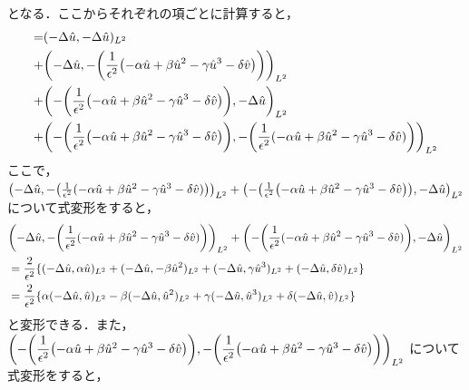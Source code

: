 となる．ここからそれぞれの項ごとに計算すると，
\begin{align}
   =&(-\Delta \hat{u},-\Delta \hat{u})_{L^2}\\
   +&\qty(-\Delta \hat{u},-\qty(\dfrac{1}{\epsilon^2}\qty(-\alpha \hat{u} + \beta \hat{u}^2 -\gamma \hat{u}^3-\delta \hat{v})))_{L^2}\\
   +&\qty(-\qty(\frac{1}{\epsilon^2}\qty(-\alpha \hat{u} + \beta \hat{u}^2 -\gamma \hat{u}^3-\delta \hat{v})),-\Delta \hat{u})_{L^2}\\
   +&\qty(-\qty(\frac{1}{\epsilon^2}\qty(-\alpha \hat{u} + \beta \hat{u}^2 -\gamma \hat{u}^3-\delta \hat{v})),-\qty(\frac{1}{\epsilon^2}(-\alpha \hat{u} + \beta \hat{u}^2 -\gamma \hat{u}^3-\delta \hat{v})))_{L^2}\\
\end{align}
ここで，
\(\qty(-\Delta \hat{u},-\qty(\frac{1}{\epsilon^2}(-\alpha \hat{u} + \beta \hat{u}^2 -\gamma \hat{u}^3-\delta \hat{v})))_{L^2}
+\qty(-\qty(\frac{1}{\epsilon^2}\qty(-\alpha \hat{u} + \beta \hat{u}^2 -\gamma \hat{u}^3-\delta \hat{v})),-\Delta \hat{u})_{L^2}\)
について式変形をすると，
\begin{align}
 &\qty(-\Delta \hat{u},-\qty(\frac{1}{\epsilon^2}(-\alpha \hat{u} + \beta \hat{u}^2 -\gamma \hat{u}^3-\delta \hat{v})))_{L^2}
 +\qty(-\qty(\frac{1}{\epsilon^2}(-\alpha \hat{u} + \beta \hat{u}^2 -\gamma \hat{u}^3-\delta \hat{v})),-\Delta \hat{u})_{L^2}\\
 &=
 \dfrac{2}{\epsilon^2}\{(-\Delta \hat{u},\alpha \hat{u})_{L^2}
 +(-\Delta \hat{u},-\beta \hat{u}^2)_{L^2}
 +(-\Delta \hat{u},\gamma \hat{u}^3)_{L^2}
 +(-\Delta \hat{u},\delta \hat{v})_{L^2}\}\\
 &=
 \dfrac{2}{\epsilon^2}\{\alpha(-\Delta \hat{u},\hat{u})_{L^2}
 -\beta(-\Delta \hat{u}, \hat{u}^2)_{L^2}
 +\gamma(-\Delta \hat{u}, \hat{u}^3)_{L^2}
 +\delta(-\Delta \hat{u}, \hat{v})_{L^2}\}\\
\end{align}
と変形できる．また，
\(\qty(-\qty(\dfrac{1}{\epsilon^2}\qty(-\alpha \hat{u} + \beta \hat{u}^2 -\gamma \hat{u}^3-\delta \hat{v})),
   -\qty(\dfrac{1}{\epsilon^2}\qty(-\alpha \hat{u} + \beta \hat{u}^2 -\gamma \hat{u}^3-\delta \hat{v})))_{L^2}\)
について式変形をすると，
